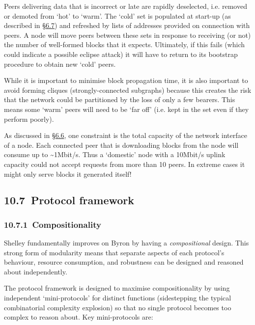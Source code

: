 \documentclass[]{article}
\begin{document}
Peers delivering data that is incorrect or late are rapidly deselected,
i.e. removed or demoted from `hot' to `warm'. The `cold' set is
populated at start-up (as described in
\protect\hyperlink{decentralisation-design}{{§6.7}}) and refreshed by
lists of addresses provided on connection with peers. A node will move
peers between these sets in response to receiving (or not) the number of
well-formed blocks that it expects. Ultimately, if this fails (which
could indicate a possible eclipse attack) it will have to return to its
bootstrap procedure to obtain new `cold' peers.

While it is important to minimise block propagation time, it is also
important to avoid forming cliques (strongly-connected subgraphs)
because this creates the risk that the network could be partitioned by
the loss of only a few bearers. This means some `warm' peers will need
to be `far off' (i.e. kept in the set even if they perform poorly).

As discussed in
\protect\hyperlink{decentralisation-constraints}{{§6.6}}, one constraint
is the total capacity of the network interface of a node. Each connected
peer that is downloading blocks from the node will consume up to
\textasciitilde{}1Mbit/s. Thus a `domestic' node with a 10Mbit/s uplink
capacity could not accept requests from more than 10 peers. In extreme
cases it might only serve blocks it generated itself!

\hypertarget{protocol-framework}{%
\subsection{​10.7​~Protocol framework}\label{protocol-framework}}

\hypertarget{compositionality}{%
\subsubsection{​10.7.1​~Compositionality}\label{compositionality}}

Shelley fundamentally improves on Byron by having a \emph{compositional}
design. This strong form of modularity means that separate aspects of
each protocol's behaviour, resource consumption, and robustness can be
designed and reasoned about independently.

The protocol framework is designed to maximise compositionality by using
independent `mini-protocols' for distinct functions (sidestepping the
typical combinatorial complexity explosion) so that no single protocol
becomes too complex to reason about. Key mini-protocols are:
\end{document}
